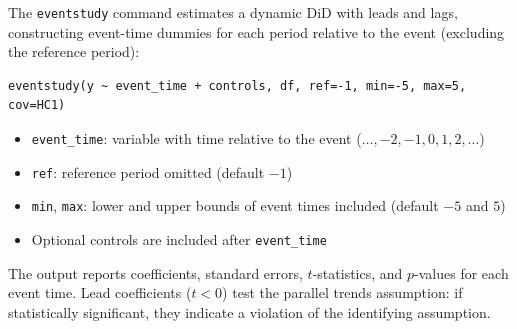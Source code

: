 The \texttt{eventstudy} command estimates a dynamic DiD with leads and
lags, constructing event-time dummies for each period relative to the
event (excluding the reference period):

\begin{lstlisting}
eventstudy(y ~ event_time + controls, df, ref=-1, min=-5, max=5, cov=HC1)
\end{lstlisting}

\begin{itemize}
  \item \texttt{event\_time}: variable with time relative to the event
    ($\ldots, -2, -1, 0, 1, 2, \ldots$)
  \item \texttt{ref}: reference period omitted (default $-1$)
  \item \texttt{min}, \texttt{max}: lower and upper bounds of event
    times included (default $-5$ and $5$)
  \item Optional controls are included after \texttt{event\_time}
\end{itemize}

The output reports coefficients, standard errors, $t$-statistics, and
$p$-values for each event time. Lead coefficients ($t < 0$) test the
parallel trends assumption: if statistically significant, they indicate
a violation of the identifying assumption.
